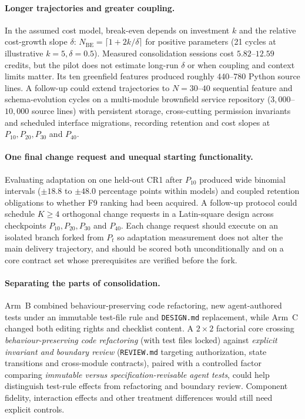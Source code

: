 \paragraph{Longer trajectories and greater coupling.}
In the assumed cost model, break-even depends on investment $k$ and the
relative cost-growth slope $\delta$: $N_{\mathrm{BE}}=\lceil 1+2k/\delta\rceil$
for positive parameters (21 cycles at illustrative $k=5,\delta=0.5$).
Measured consolidation sessions cost $5.82$--$12.59$ credits, but the pilot
does not estimate long-run $\delta$ or when coupling and context limits matter.
Its ten greenfield features produced roughly 440--780 Python source lines.
A follow-up could extend
trajectories to $N=30$--$40$ sequential feature and schema-evolution cycles
on a multi-module brownfield service repository ($3{,}000$--$10{,}000$
source lines) with persistent storage, cross-cutting permission invariants
and scheduled interface migrations, recording retention and cost slopes at
$P_{10},P_{20},P_{30}$ and $P_{40}$.

\paragraph{One final change request and unequal starting functionality.}
Evaluating adaptation on one held-out CR1 after $P_{10}$ produced wide
binomial intervals ($\pm18.8$ to $\pm48.0$ percentage points within models)
and coupled retention obligations to whether F9 ranking had been acquired.
A follow-up protocol could schedule $K\geq4$ orthogonal change requests in
a Latin-square design across checkpoints $P_{10},P_{20},P_{30}$ and $P_{40}$.
Each change request should execute on an isolated branch forked from $P_t$
so adaptation measurement does not alter the main delivery trajectory, and
should be scored both unconditionally and on a core contract set whose
prerequisites are verified before the fork.

\paragraph{Separating the parts of consolidation.}
Arm~B combined behaviour-preserving code refactoring, new agent-authored
tests under an immutable test-file rule and \texttt{DESIGN.md} replacement,
while Arm~C changed both editing rights and checklist content. A $2\times2$
factorial core crossing \emph{behaviour-preserving code refactoring} (with
test files locked) against \emph{explicit invariant and boundary review}
(\texttt{REVIEW.md} targeting authorization, state transitions and
cross-module contracts), paired with a controlled factor comparing
\emph{immutable versus specification-revisable agent tests}, could help
distinguish test-rule effects from refactoring and boundary review.
Component fidelity, interaction effects and other treatment differences
would still need explicit controls.


